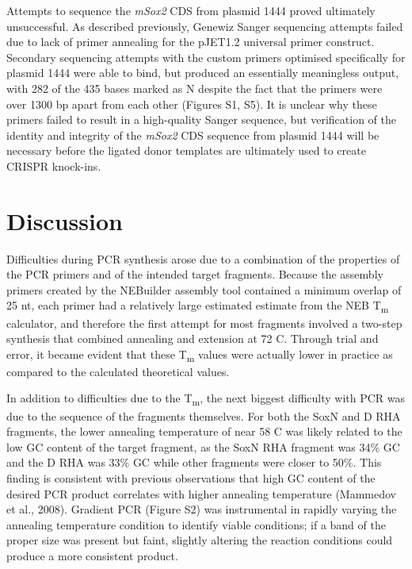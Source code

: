 \documentclass[withindex,glossary]{cam-thesis}
\begin{document}
Attempts to sequence the \emph{mSox2} CDS from plasmid 1444 proved
ultimately unsuccessful. As described previously, Genewiz Sanger
sequencing attempts failed due to lack of primer annealing for the
pJET1.2 universal primer construct. Secondary sequencing attempts with
the custom primers optimised specifically for plasmid 1444 were able to
bind, but produced an essentially meaningless output, with 282 of the
435 bases marked as N despite the fact that the primers were over 1300
bp apart from each other (Figures S1, S5). It is unclear why these
primers failed to result in a high-quality Sanger sequence, but
verification of the identity and integrity of the \emph{mSox2} CDS
sequence from plasmid 1444 will be necessary before the ligated donor
templates are ultimately used to create CRISPR knock-ins.

\section{Discussion}

Difficulties during PCR synthesis arose due to a combination of the
properties of the PCR primers and of the intended target fragments.
Because the assembly primers created by the NEBuilder assembly tool
contained a minimum overlap of 25 nt, each primer had a relatively large
estimated estimate from the NEB T\textsubscript{m} calculator, and
therefore the first attempt for most fragments involved a two-step
synthesis that combined annealing and extension at 72 \textdegree{}C. Through trial
and error, it became evident that these T\textsubscript{m} values were
actually lower in practice as compared to the calculated theoretical
values.

In addition to difficulties due to the T\textsubscript{m}, the next
biggest difficulty with PCR was due to the sequence of the fragments
themselves. For both the SoxN and D RHA fragments, the lower annealing
temperature of near 58 \textdegree{}C was likely related to the low GC content of
the target fragment, as the SoxN RHA fragment was 34\% GC and the D RHA
was 33\% GC while other fragments were closer to 50\%. This finding is
consistent with previous observations that high GC content of the
desired PCR product correlates with higher annealing temperature
(Mammedov et al., 2008). Gradient PCR (Figure S2) was instrumental in
rapidly varying the annealing temperature condition to identify viable
conditions; if a band of the proper size was present but faint, slightly
altering the reaction conditions could produce a more consistent
product.
\end{document}
